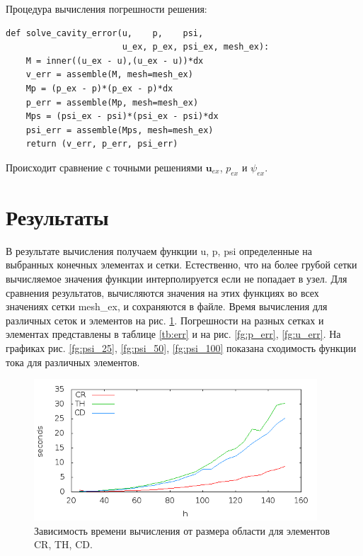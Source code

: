\documentclass[12pt]{article}
\begin{document}
Процедура вычисления погрешности решения:
\begin{lstlisting}
def solve_cavity_error(u,    p,    psi,    
                       u_ex, p_ex, psi_ex, mesh_ex):
    M = inner((u_ex - u),(u_ex - u))*dx
    v_err = assemble(M, mesh=mesh_ex)    
    Mp = (p_ex - p)*(p_ex - p)*dx
    p_err = assemble(Mp, mesh=mesh_ex)
    Mps = (psi_ex - psi)*(psi_ex - psi)*dx
    psi_err = assemble(Mps, mesh=mesh_ex)
    return (v_err, p_err, psi_err)
\end{lstlisting}
Происходит сравнение с точными решениями ${\bm u_{ex}}$, $p_{ex}$ и $\psi_{ex}$.

\section{Результаты}
В результате вычисления получаем функции u, p, psi определенные на выбранных конечных элементах и сетки. Естественно, что на более грубой сетки вычисляемое значения функции интерполируется если не попадает в узел. Для сравнения результатов, вычисляются значения на этих функциях во всех значениях сетки mesh\_ex, и сохраняются в файле. Время вычисления для различных сеток и элементов на рис. \ref{fg:time}. Погрешности на разных сетках и элементах представлены в таблице \ref{tb:err} и на рис. \ref{fg:p_err}, \ref{fg:u_err}.
На графиках рис. \ref{fg:psi_25}, \ref{fg:psi_50}, \ref{fg:psi_100} показана сходимость функции тока для различных элементов. 

\begin{figure}
	\begin{center}
		\includegraphics[width=400px]{pics/time}
		\caption{Зависимость времени вычисления от размера области для элементов CR, TH, CD.}
		\label{fg:time}
	\end{center}
\end{figure}
\end{document}
